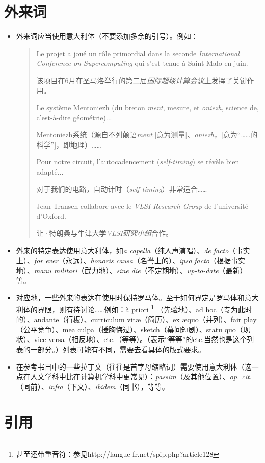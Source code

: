 \section{外来词}

\begin{itemize}
    \item 外来词应当使用意大利体（不要添加多余的引号）。例如：
    \begin{quote}
        Le projet a joué un rôle primordial dans la seconde \emph{International Conference on Supercomputing} qui s’est tenue à Saint-Malo en juin.
        \begin{bil}
            该项目在6月在圣马洛举行的第二届\emph{国际超级计算会议}上发挥了关键作用。
        \end{bil}

        Le système Mentoniezh (du breton \emph{ment}, mesure, et \emph{oniezh}, science de, c’est-à-dire géométrie)...
        \begin{bil}
            Mentoniezh系统（源自不列颠语\emph{ment} [意为测量]、\emph{oniezh}，[意为“……的科学”]，即地理）……
        \end{bil}

        Pour notre circuit, l’autocadencement (\emph{self-timing}) se révèle bien adapté...
        \begin{bil}
            对于我们的电路，自动计时（\emph{self-timing}）非常适合……
        \end{bil}

        Jean Transen collabore avec le \emph{VLSI Research Group} de l’université d’Oxford.
        \begin{bil}
            让·特朗桑与牛津大学\emph{VLSI研究小组}合作。
        \end{bil}
    \end{quote}
    \item 外来的特定表达使用意大利体，如\emph{a capella}（纯人声演唱）、\emph{de facto}（事实上）、\emph{for ever}（永远）、\emph{honoris causa}（名誉上的）、\emph{ipso facto}（根据事实地）、\emph{manu militari}（武力地）、\emph{sine die}（不定期地）、\emph{up-to-date}（最新）等。
    \item 对应地，一些外来的表达在使用时保持罗马体。至于如何界定是罗马体和意大利体的界限，则有待讨论……例如：à priori
        \footnote{甚至还带重音符：参见http://langue-fr.net/spip.php?article128}
    （先验地）、ad hoc（专为此时的）、andante（行板）、curriculum vitæ（简历）、ex æquo（并列）、fair play（公平竞争）、mea culpa（捶胸悔过）、sketch（幕间短剧）、statu quo（现状）、vice versa（相反地）、etc.（等等）。（表示“等等”的etc.当然也是这个列表的一部分。）列表可能有不同，需要去看具体的版式要求。
    \item 在参考书目中的一些拉丁文（往往是首字母缩略词）需要使用意大利体（这一点在人文学科中比在计算机学科中更常见）：\emph{passim}（及其他位置）、\emph{op. cit.}（同前）、\emph{infra}（下文）、\emph{ibidem}（同书），等等。
\end{itemize}

\section{引用}

